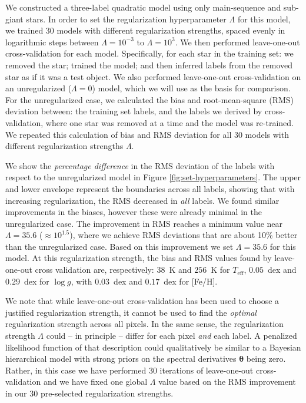 \documentclass[preprint]{aastex}
\newcommand{\teff}{T_{\mathrm{eff}}}
\newcommand{\logg}{\log g}
\newcommand{\Dvector}[1]{\boldsymbol{#1}}
\newcommand{\vectheta}{\Dvector{\theta}}
\begin{document}
We constructed a three-label quadratic model using only main-sequence and sub-giant
stars. In order to set the regularization hyperparameter $\Lambda$ for this model, we 
trained 30 models with different regularization strengths, spaced evenly in logarithmic
steps between $\Lambda = 10^{-3}$ to $\Lambda = 10^{3}$.  We then performed leave-one-out 
cross-validation for each model.  Specifically, for each star in the training set: we 
removed the star; trained the model; and then inferred labels from the removed star as 
if it was a test object.  We also performed leave-one-out cross-validation on an 
unregularized ($\Lambda = 0$) model, which we will use as the basis for comparison.  
For the unregularized case, we calculated the bias and root-mean-square (RMS) deviation 
between: the training set labels, and the labels we derived by cross-validation, where 
one star was removed at a time and the model was re-trained.  We repeated this calculation
of bias and RMS deviation for all 30 models with different regularization strengths $\Lambda$. 


We show the \emph{percentage difference} in the RMS deviation of the labels with respect
to the unregularized model in Figure \ref{fig:set-hyperparameters}.  The upper 
and lower envelope represent the boundaries across all labels, showing that with increasing
regularization, the RMS decreased in \emph{all} labels.  We found similar
improvements in the biases, however these were already minimal in the unregularized
case.  The improvement in RMS reaches a minimum value near 
$\Lambda = 35.6$ ($\approx10^{1.5}$), where
we achieve RMS deviations that are about 10\% better than the unregularized case.
Based on this improvement we set $\Lambda = 35.6$ for this model.  At this regularization 
strength, the bias and RMS values found by leave-one-out
cross validation are, respectively: $38$~K and $256$~K for $\teff$, $0.05$~dex and 
$0.29$~dex for $\logg$, with $0.03$~dex and $0.17$~dex for [Fe/H].


We note that while leave-one-out cross-validation has been used to choose a justified
regularization strength, it cannot be used to find the \emph{optimal} regularization
strength across all pixels. In the same sense, the regularization strength $\Lambda$
could -- in principle -- differ for each pixel \emph{and} each label. A penalized
likelihood function of that description could qualitatively be similar to a
Bayesian hierarchical model with strong priors on the spectral derivatives $\vectheta$ being
zero. Rather, in this case we have performed 30 iterations of leave-one-out
cross-validation and we have fixed one global $\Lambda$ value based on the RMS 
improvement in our 30 pre-selected regularization strengths.
\end{document}
